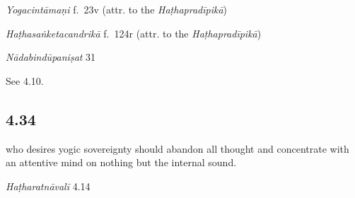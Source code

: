 \begin{ekdosis}

\begin{testimonia}[hp04_033_1]
\emph{Yogacintāmaṇi} f.~23v (attr. to the \emph{Haṭhapradīpikā})
\begin{versinnote}
\end{versinnote}

\emph{Haṭhasaṅketacandrikā} f.~124r (attr. to the \emph{Haṭhapradīpikā})
\begin{versinnote}
\tl{\var{dakṣiṇe karṇe ] B220,  dakṣirṇe 2244}\\!}
\end{versinnote}

\emph{Nādabindūpaniṣat} 31
\begin{versinnote}
\end{versinnote}
\end{testimonia}

\begin{philcomm}[hp04_033_1]
See 4.10.
\end{philcomm}

\subsection*{4.34}
\begin{translation} who desires yogic sovereignty should abandon all thought and concentrate with an attentive mind on nothing but the internal sound.
\end{translation}


\begin{testimonia}[hp04_034]
\emph{Haṭharatnāvalī} 4.14
\begin{versinnote}
\end{versinnote}


\end{testimonia}
\end{ekdosis}
